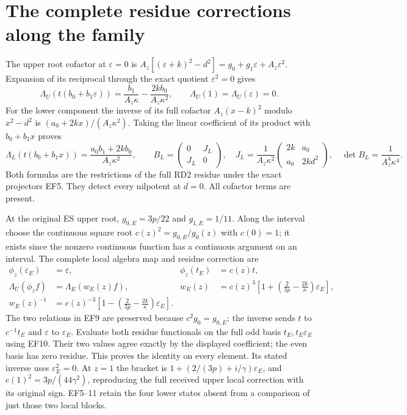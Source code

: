 \documentclass[11pt]{article}
\begin{document}
\section{The complete residue corrections along the family}
The upper root cofactor at $\varepsilon=0$ is
$A_z[(\varepsilon+k)^2-d^2]=g_0+g_1\varepsilon+A_z\varepsilon^2$.
Expansion of its reciprocal through the exact quotient
$\varepsilon^2=0$ gives
\begin{equation}
 \Lambda_U(t(b_0+b_1\varepsilon))
   =\frac{b_1}{A_z\kappa}-\frac{2k b_0}{A_z\kappa^2},\qquad
 \Lambda_U(1)=\Lambda_U(\varepsilon)=0.
 \tag{EF10}
\end{equation}
For the lower component the inverse of its full cofactor
$A_z(x-k)^2$ modulo $x^2-d^2$ is
$(a_0+2kx)/(A_z\kappa^2)$. Taking the linear coefficient
of its product with $b_0+b_1x$ proves
\begin{equation}
 \Lambda_L(t(b_0+b_1x))
   =\frac{a_0b_1+2kb_0}{A_z\kappa^2},\qquad
 B_L=\begin{pmatrix}0&J_L\\J_L&0\end{pmatrix},\quad
 J_L=\frac1{A_z\kappa^2}
       \begin{pmatrix}2k&a_0\\a_0&2kd^2\end{pmatrix},\quad
 \det B_L=\frac1{A_z^4\kappa^4}.
 \tag{EF11}
\end{equation}
Both formulas are the restrictions of the full RD2
residue under the exact projectors EF5. They detect
every nilpotent at $d=0$. All cofactor terms are present.

At the original ES upper root, $g_{0,E}=3p/22$ and
$g_{1,E}=1/11$. Along the interval choose the continuous
square root $c(z)^2=g_{0,E}/g_0(z)$ with $c(0)=1$;
it exists since the nonzero continuous function has a
continuous argument on an interval. The complete local
algebra map and residue correction are
\begin{equation}
\begin{aligned}
 \phi_z(\varepsilon_E)&=\varepsilon,&\phi_z(t_E)&=c(z)t,\\
 \Lambda_U(\phi_z f)&=\Lambda_E(w_E(z)f),&
 w_E(z)&=c(z)^3\left[1+
       \left(\frac2{3p}-\frac{2k}{\kappa}\right)\varepsilon_E\right],\\
 w_E(z)^{-1}&=c(z)^{-3}\left[1-
       \left(\frac2{3p}-\frac{2k}{\kappa}\right)\varepsilon_E\right].
\end{aligned}\tag{EF12}
\end{equation}
The two relations in EF9 are preserved because
$c^2g_0=g_{0,E}$; the inverse sends $t$ to $c^{-1}t_E$
and $\varepsilon$ to $\varepsilon_E$. Evaluate both
residue functionals on the full odd basis
$t_E,t_E\varepsilon_E$ using EF10. Their two values
agree exactly by the displayed coefficient; the even
basis has zero residue. This proves the identity on
every element. Its stated inverse uses
$\varepsilon_E^2=0$. At $z=1$ the bracket is
$1+(2/(3p)+i/\gamma)\varepsilon_E$, and
$c(1)^2=3p/(44\gamma^2)$, reproducing the full
received upper local correction with its original sign.
EF5--11 retain the four lower states absent from a
comparison of just those two local blocks.
\end{document}

